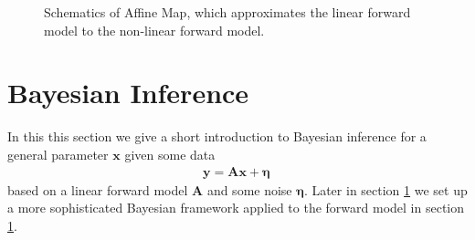 \begin{figure}[ht!]
	\centering
	\caption[Schematics of Affine Map]{Schematics of Affine Map, which approximates the linear forward model to the non-linear forward model.}
\end{figure}

\section{Bayesian Inference}
In this this section we give a short introduction to Bayesian inference for a general parameter $\bm{x}$ given some data 
\begin{align}
	\bm{y} = \bm{Ax} + \bm{\eta} \, 
	\label{eq:LinDat}
\end{align}
based on a linear forward model $\bm{A}$ and some noise $ \bm{\eta}$.
Later in section \ref{} we set up a more sophisticated Bayesian framework applied to the forward model in section \ref{}.

